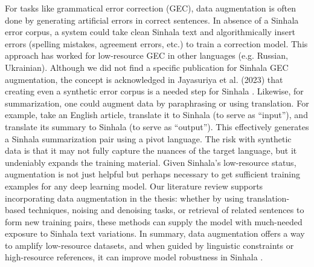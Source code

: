 \documentclass[12pt]{uomthesis}
\begin{document}
For tasks like grammatical error correction (GEC), data augmentation is often done by generating artificial errors in correct sentences. In absence of a Sinhala error corpus, a system could take clean Sinhala text and algorithmically insert errors (spelling mistakes, agreement errors, etc.) to train a correction model. This approach has worked for low-resource GEC in other languages (e.g. Russian, Ukrainian). Although we did not find a specific publication for Sinhala GEC augmentation, the concept is acknowledged in Jayasuriya et al. (2023) that creating even a synthetic error corpus is a needed step for Sinhala \cite{5}. Likewise, for summarization, one could augment data by paraphrasing or using translation. For example,  take an English article, translate it to Sinhala (to serve as “input”), and translate its summary to Sinhala (to serve as “output”). This effectively generates a Sinhala summarization pair using a pivot language. The risk with synthetic data is that it may not fully capture the nuances of the target language, but it undeniably expands the training material. Given Sinhala’s low-resource status, augmentation is not just helpful but perhaps necessary to get sufficient training examples for any deep learning model. Our literature review supports incorporating data augmentation in the thesis: whether by using translation-based techniques, noising and denoising tasks, or retrieval of related sentences to form new training pairs, these methods can supply the model with much-needed exposure to Sinhala text variations. In summary, data augmentation offers a way to amplify low-resource datasets, and when guided by linguistic constraints or high-resource references, it can improve model robustness in Sinhala \cite{22}.
\end{document}
